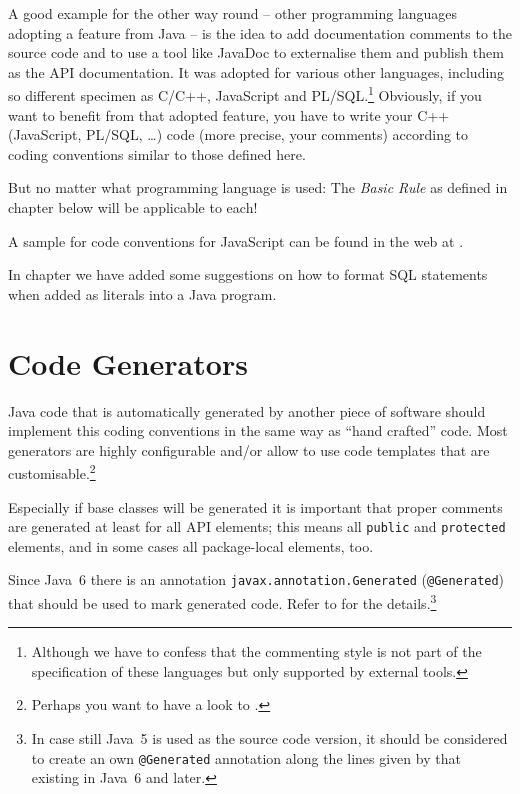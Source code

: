 A good example for the other way round – other programming languages adopting a feature from Java – is the idea to add documentation comments to the source code and to use a tool like JavaDoc to externalise them and publish them as the API documentation. It was adopted for various other languages, including so different specimen as C/C++, JavaScript and PL/SQL.\footnote{Although we have to confess that the commenting style is not part of the specification of these languages but only supported by external tools.} Obviously, if you want to benefit from that adopted feature, you have to write your C++ (JavaScript, PL/SQL, …) code (more precise, your comments) according to coding conventions similar to those defined here.

But no matter what programming language is used: The \textit{Basic Rule} as defined in chapter  below will be applicable to each!

A sample for code conventions for JavaScript can be found in the web at \autocite{Crockford:JAVASCRIPT_CODE_CONVENTIONS}.

In chapter  we have added some suggestions on how to format SQL statements when added as literals into a Java program.

\section{Code Generators}
Java code that is automatically generated by another piece of software should implement this coding conventions in the same way as “hand crafted” code. Most generators are highly configurable and/or allow to use code templates that are customisable.\footnote{Perhaps you want to have a look to \autocite{TQUADRAT_ORG_FOUNDATION_JAVACOMPOSER}.}

Especially if base classes will be generated it is important that proper comments are generated at least for all API elements; this means all \lstinline|public| and \lstinline|protected| elements, and in some cases all package-local elements, too.

Since Java~6 there is an annotation \lstinline|javax.annotation.Generated| (\lstinline|@Generated|) that should be used to mark generated code. Refer to \autocite{ORACLE_DOC_GENERATED_ANNOTATION} for the details.\footnote{In case still Java~5 is used as the source code version, it should be considered to create an own \lstinline|@Generated| annotation along the lines given by that existing in Java~6 and later.}

